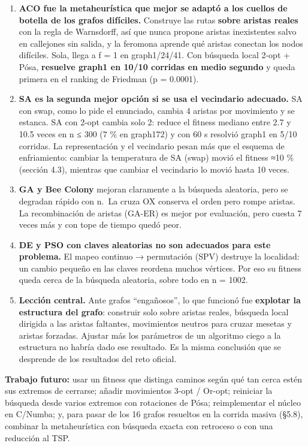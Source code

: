 \documentclass[
  spanish,
  11pt,
]{article}
\providecommand{\tightlist}{%
  \setlength{\itemsep}{0pt}\setlength{\parskip}{0pt}}
\begin{document}
\begin{enumerate}
\def\labelenumi{\arabic{enumi}.}
\tightlist
\item
  \textbf{ACO fue la metaheurística que mejor se adaptó a los cuellos de
  botella de los grafos difíciles.} Construye las rutas \textbf{sobre
  aristas reales} con la regla de Warnsdorff, así que nunca propone
  aristas inexistentes salvo en callejones sin salida, y la feromona
  aprende qué aristas conectan los nodos difíciles. Sola, llega a f = 1
  en graph1/24/41. Con búsqueda local 2-opt + Pósa, \textbf{resuelve
  graph1 en 10/10 corridas en medio segundo} y queda primera en el
  ranking de Friedman (p = 0.0001).
\item
  \textbf{SA es la segunda mejor opción si se usa el vecindario
  adecuado.} SA con swap, como lo pide el enunciado, cambia 4 aristas
  por movimiento y se estanca. SA con 2-opt cambia solo 2: reduce el
  fitness mediano entre 2.7 y 10.5 veces en n ≤ 300 (7 \% en graph172) y
  con 60 s resolvió graph1 en 5/10 corridas. La representación y el
  vecindario pesan más que el esquema de enfriamiento: cambiar la
  temperatura de SA (swap) movió el fitness ≈10 \% (sección 4.3),
  mientras que cambiar el vecindario lo movió hasta 10 veces.
\item
  \textbf{GA y Bee Colony} mejoran claramente a la búsqueda aleatoria,
  pero se degradan rápido con n.~La cruza OX conserva el orden pero
  rompe aristas. La recombinación de aristas (GA-ER) es mejor por
  evaluación, pero cuesta 7 veces más y con tope de tiempo quedó peor.
\item
  \textbf{DE y PSO con claves aleatorias no son adecuados para este
  problema.} El mapeo continuo → permutación (SPV) destruye la
  localidad: un cambio pequeño en las claves reordena muchos vértices.
  Por eso su fitness queda cerca de la búsqueda aleatoria, sobre todo en
  n = 1002.
\item
  \textbf{Lección central.} Ante grafos ``engañosos'', lo que funcionó
  fue \textbf{explotar la estructura del grafo}: construir solo sobre
  aristas reales, búsqueda local dirigida a las aristas faltantes,
  movimientos neutros para cruzar mesetas y aristas forzadas. Ajustar
  más los parámetros de un algoritmo ciego a la estructura no habría
  dado ese resultado. Es la misma conclusión que se desprende de los
  resultados del reto oficial.
\end{enumerate}

\textbf{Trabajo futuro:} usar un fitness que distinga caminos según qué
tan cerca estén sus extremos de cerrarse; añadir movimientos 3-opt /
Or-opt; reiniciar la búsqueda desde varios extremos con rotaciones de
Pósa; reimplementar el núcleo en C/Numba; y, para pasar de los 16 grafos
resueltos en la corrida masiva (§5.8), combinar la metaheurística con
búsqueda exacta con retroceso o con una reducción al TSP.
\end{document}
